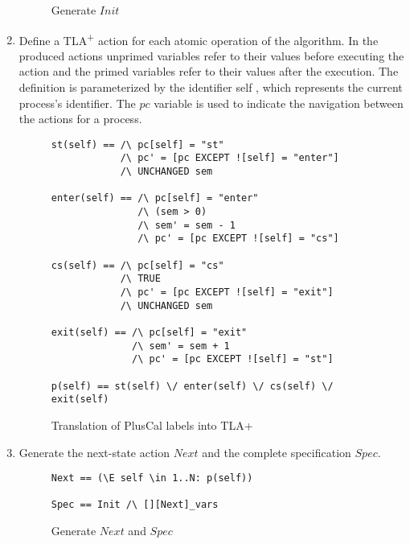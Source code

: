 \documentclass{thesul}
\newcommand{\tlaplus}{TLA\textsuperscript{+}\xspace}
\begin{document}
\begin{enumerate}
\begin{figure}[!h]
\begin{lstlisting}[frame = tlrb, firstnumber = 1, xleftmargin=.2\textwidth, xrightmargin=.2\textwidth]
\end{lstlisting}

\caption{Generate $Init$}
\label{GenInit}
\end{figure} 


\item Define a \tlaplus action for each atomic operation of the algorithm. In the produced actions unprimed variables refer to their values before executing the action and the primed variables refer to their values after the execution.
The definition is parameterized by the identifier self ,
which represents the current process’s identifier.
The $pc$ variable is used to indicate the navigation between the actions for a process.

\begin{figure}[!h]
\centering
\begin{lstlisting}[frame = tlrb, firstnumber = 1]
st(self) == /\ pc[self] = "st"
            /\ pc' = [pc EXCEPT ![self] = "enter"]
            /\ UNCHANGED sem

enter(self) == /\ pc[self] = "enter"
               /\ (sem > 0)
               /\ sem' = sem - 1
               /\ pc' = [pc EXCEPT ![self] = "cs"]

cs(self) == /\ pc[self] = "cs"
            /\ TRUE
            /\ pc' = [pc EXCEPT ![self] = "exit"]
            /\ UNCHANGED sem

exit(self) == /\ pc[self] = "exit"
              /\ sem' = sem + 1
              /\ pc' = [pc EXCEPT ![self] = "st"]
              
p(self) == st(self) \/ enter(self) \/ cs(self) \/ exit(self)

\end{lstlisting}
\caption{Translation of PlusCal labels into TLA+}
\label{GenActions}
\end{figure} 

\item Generate the next-state action $Next$ and the complete specification $Spec$.

\begin{figure}[!h]
\begin{lstlisting}[frame = tlrb, firstnumber = 1, xleftmargin=.2\textwidth, xrightmargin=.2\textwidth]
Next == (\E self \in 1..N: p(self))

Spec == Init /\ [][Next]_vars

\end{lstlisting}

\caption{Generate $Next$ and $Spec$}
\label{GenNextSpec}
\end{figure} 

\end{enumerate}
\end{document}
